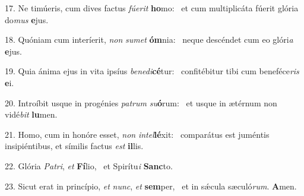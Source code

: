 17. Ne timúeris, cum dives factus \textit{fú}\textit{e}\textit{rit} \textbf{ho}mo: \ast\  et cum multiplicáta fúerit glória do\textit{mus} \textbf{e}jus.\

18. Quóniam cum interíerit, \textit{non} \textit{su}\textit{met} \textbf{óm}nia: \ast\  neque descéndet cum eo glóri\textit{a} \textbf{e}jus.\

19. Quia ánima ejus in vita ipsíus \textit{be}\textit{ne}\textit{di}\textbf{cé}tur: \ast\  confitébitur tibi cum beneféce\textit{ris} \textbf{e}i.\

20. Introíbit usque in progénies \textit{pa}\textit{trum} \textit{su}\textbf{ó}rum: \ast\  et usque in ætérnum non vidé\textit{bit} \textbf{lu}men.\

21. Homo, cum in honóre esset, \textit{non} \textit{in}\textit{tel}\textbf{lé}xit: \ast\  comparátus est juméntis insipiéntibus, et símilis factus \textit{est} \textbf{il}lis.\

22. Glória \textit{Pa}\textit{tri}, \textit{et} \textbf{Fí}lio, \ast\  et Spirítu\textit{i} \textbf{Sanc}to.\

23. Sicut erat in princípio, \textit{et} \textit{nunc}, \textit{et} \textbf{sem}per, \ast\  et in sǽcula sæculó\textit{rum}. \textbf{A}men.\

